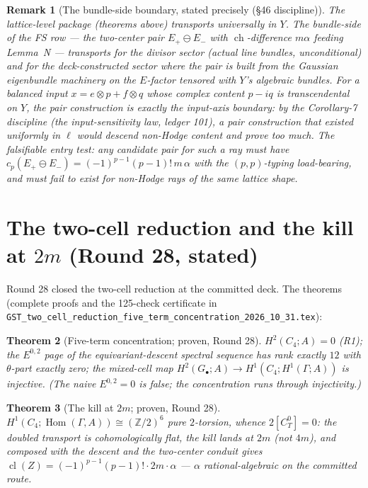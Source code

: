\documentclass[11pt]{article}
\newcommand{\ch}{\operatorname{ch}}
\newcommand{\Z}{\mathbb Z}
\newcommand{\Hom}{\operatorname{Hom}}
\newcommand{\Cl}{\operatorname{cl}}
\newtheorem{theorem}{Theorem}[section]
\newtheorem{remark}[theorem]{Remark}
\begin{document}
\begin{remark}[The bundle-side boundary, stated precisely (§46 discipline)]
The lattice-level package (theorems above) transports universally in $Y$.
The \emph{bundle-side} of the FS row --- the two-center pair
$E_+\ominus E_-$ with $\ch$-difference $m\alpha$ feeding Lemma~N ---
transports for the divisor sector (actual line bundles, unconditional) and
for the deck-constructed sector where the pair is built from the Gaussian
eigenbundle machinery on the $E$-factor tensored with $Y$'s algebraic
bundles. For a balanced input $x=e\otimes p+f\otimes q$ whose complex
content $p-iq$ is \emph{transcendental} on $Y$, the pair construction is exactly the
input-axis boundary: by the Corollary-7 discipline (the input-sensitivity
law, ledger 101), a pair construction that existed uniformly in
$\ell$ would descend non-Hodge content and prove too much. The falsifiable
entry test: any candidate pair for such a ray must have
$c_p(E_+\ominus E_-)=(-1)^{p-1}(p-1)!\,m\,\alpha$ with the $(p,p)$-typing
load-bearing, and must \emph{fail to exist} for non-Hodge rays of the
same lattice shape.
\end{remark}

\section{The two-cell reduction and the kill at $2m$ (Round 28, stated)}
\label{sec:twocell}

Round 28 closed the two-cell reduction at the committed deck. The
theorems (complete proofs and the 125-check certificate in
\texttt{GST\_two\_cell\_reduction\_five\_term\_concentration\_2026\_10\_31.tex}):

\begin{theorem}[Five-term concentration; proven, Round 28]
$H^2(C_4;A)=0$ (R1); the $E^{0,2}$ page of the equivariant-descent
spectral sequence has rank exactly $12$ with $\theta$-part exactly zero;
the mixed-cell map $H^2(G_\bullet;A)\to H^1(C_4;H^1(\Gamma;A))$ is
injective. (The naive $E^{0,2}=0$ is false; the concentration runs through
injectivity.)
\end{theorem}

\begin{theorem}[The kill at $2m$; proven, Round 28]
$H^1(C_4;\Hom(\Gamma,A))\cong(\Z/2)^6$ pure $2$-torsion, whence
$2[C_T^0]=0$: the doubled transport is cohomologically flat, the kill
lands at $2m$ (not $4m$), and composed with the descent and the
two-center conduit gives $\Cl(Z)=(-1)^{p-1}(p-1)!\cdot2m\cdot\alpha$
--- $\alpha$ rational-algebraic on the committed route.
\end{theorem}
\end{document}
